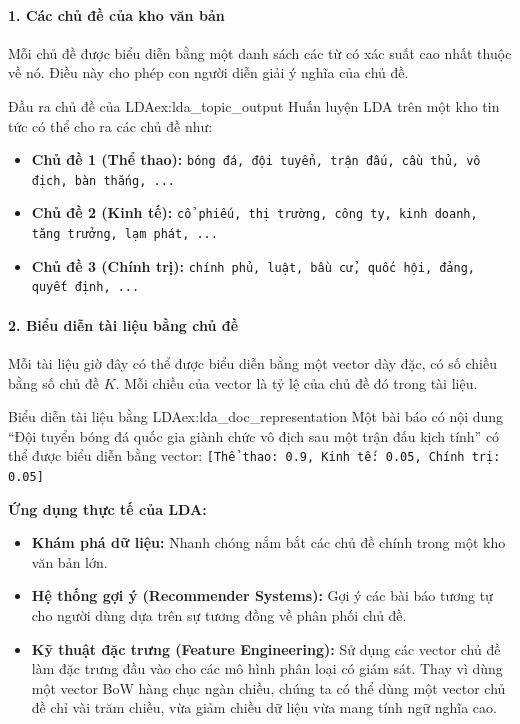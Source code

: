 \paragraph{1. Các chủ đề của kho văn bản}
Mỗi chủ đề được biểu diễn bằng một danh sách các từ có xác suất cao nhất thuộc về nó. Điều này cho phép con người diễn giải ý nghĩa của chủ đề.
\begin{example}{Đầu ra chủ đề của LDA}{ex:lda_topic_output}
    Huấn luyện LDA trên một kho tin tức có thể cho ra các chủ đề như:
    \begin{itemize}
        \item \textbf{Chủ đề 1 (Thể thao):} \texttt{bóng đá, đội tuyển, trận đấu, cầu thủ, vô địch, bàn thắng, ...}
        \item \textbf{Chủ đề 2 (Kinh tế):} \texttt{cổ phiếu, thị trường, công ty, kinh doanh, tăng trưởng, lạm phát, ...}
        \item \textbf{Chủ đề 3 (Chính trị):} \texttt{chính phủ, luật, bầu cử, quốc hội, đảng, quyết định, ...}
    \end{itemize}
\end{example}

\paragraph{2. Biểu diễn tài liệu bằng chủ đề}
Mỗi tài liệu giờ đây có thể được biểu diễn bằng một vector dày đặc, có số chiều bằng số chủ đề $K$. Mỗi chiều của vector là tỷ lệ của chủ đề đó trong tài liệu.
\begin{example}{Biểu diễn tài liệu bằng LDA}{ex:lda_doc_representation}
    Một bài báo có nội dung “Đội tuyển bóng đá quốc gia giành chức vô địch sau một trận đấu kịch tính” có thể được biểu diễn bằng vector:
    \texttt{[Thể thao: 0.9, Kinh tế: 0.05, Chính trị: 0.05]}
\end{example}

\textbf{Ứng dụng thực tế của LDA:}
\begin{itemize}
    \item \textbf{Khám phá dữ liệu:} Nhanh chóng nắm bắt các chủ đề chính trong một kho văn bản lớn.
    \item \textbf{Hệ thống gợi ý (Recommender Systems):} Gợi ý các bài báo tương tự cho người dùng dựa trên sự tương đồng về phân phối chủ đề.
    \item \textbf{Kỹ thuật đặc trưng (Feature Engineering):} Sử dụng các vector chủ đề làm đặc trưng đầu vào cho các mô hình phân loại có giám sát. Thay vì dùng một vector BoW hàng chục ngàn chiều, chúng ta có thể dùng một vector chủ đề chỉ vài trăm chiều, vừa giảm chiều dữ liệu vừa mang tính ngữ nghĩa cao.
\end{itemize}

